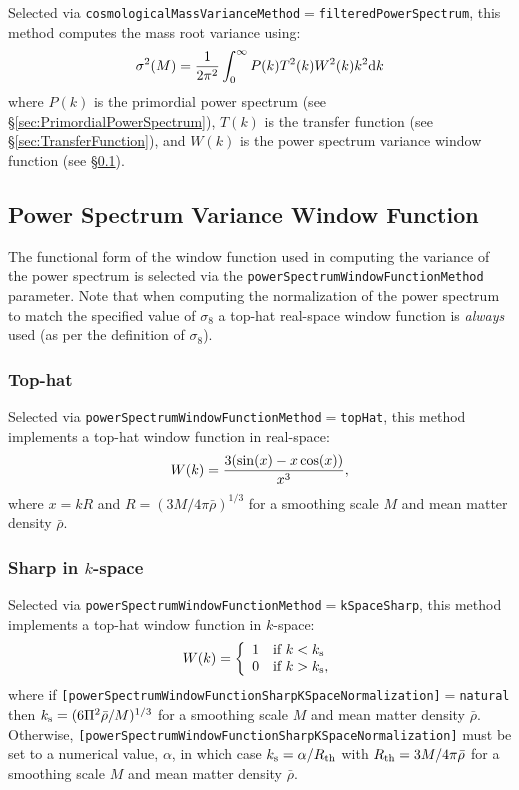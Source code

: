 Selected via {\tt cosmologicalMassVarianceMethod}$=${\tt filteredPowerSpectrum}, this method computes the mass root variance using:
\begin{equation}
 \sigma^2(M) = {1 \over 2 \pi^2} \int_0^\infty P(k) T^2(k) W^2(k) k^2 {\rm d}k
\end{equation}
where $P(k)$ is the primordial power spectrum (see \S\ref{sec:PrimordialPowerSpectrum}), $T(k)$ is the transfer function (see \S\ref{sec:TransferFunction}), and $W(k)$ is the power spectrum variance window function (see \S\ref{sec:PowerSpectrumWindowFunctionPhysics}).

\subsection{Power Spectrum Variance Window Function}\label{sec:PowerSpectrumWindowFunctionPhysics}

The functional form of the window function used in computing the variance of the power spectrum is selected via the {\tt powerSpectrumWindowFunctionMethod} parameter. Note that when computing the normalization of the power spectrum to match the specified value of $\sigma_8$ a top-hat real-space window function is \emph{always} used (as per the definition of $\sigma_8$).

\subsubsection{Top-hat}

Selected via {\tt powerSpectrumWindowFunctionMethod}$=${\tt topHat}, this method implements a top-hat window function in real-space:
\begin{equation}
 W(k) = {3 (\sin(x)-x \cos(x)) \over x^3},
\end{equation}
where $x = k R$ and $R=(3M/4\pi\bar{\rho})^{1/3}$ for a smoothing scale $M$ and mean matter density $\bar{\rho}$.

\subsubsection{Sharp in $k$-space}

Selected via {\tt powerSpectrumWindowFunctionMethod}$=${\tt kSpaceSharp}, this method implements a top-hat window function in $k$-space:
\begin{equation}
 W(k) = \left\{ \begin{array}{ll} 1 & \hbox{if } k < k_{\rm s} \\ 0 & \hbox{if } k > k_{\rm s}, \end{array} \right.
\end{equation}
where if {\tt [powerSpectrumWindowFunctionSharpKSpaceNormalization]}$=${\tt natural} then $k_{\rm s} = (6 \Pi^2 \bar{\rho} / M)^{1/3}$ for a smoothing scale $M$ and mean matter density $\bar{\rho}$. Otherwise, {\tt [powerSpectrumWindowFunctionSharpKSpaceNormalization]} must be set to a numerical value, $\alpha$, in which case $k_{\rm s} = \alpha / R_{\rm th}$ with $R_{\rm th}=3M/4\pi\bar{\rho}$ for a smoothing scale $M$ and mean matter density $\bar{\rho}$.

